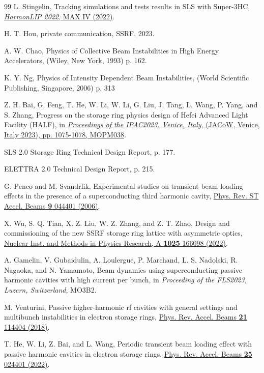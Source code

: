 \documentclass[%
 reprint,
 amsmath,amssymb,
 aps,
]{revtex4-1}
\begin{document}
\begin{thebibliography}{99}
 L. Stingelin, Tracking simulations and tests results in SLS with Super-3HC, \href{https://indico.maxiv.lu.se/event/5098/contributions/6755/attachments/1171/2310/20221001HarmonLIPworkshopV2.pptx}{\emph{HarmonLIP 2022}, MAX IV (2022)}.

 H. T. Hou, private communication, SSRF, 2023.

A. W. Chao, Physics of Collective Beam Instabilities in High Energy Accelerators, (Wiley, New York, 1993) p. 162.

K. Y. Ng,  Physics of Intensity Dependent Beam Instabilities, (World Scientific Publishing, Singapore, 2006) p. 313

Z. H. Bai, G. Feng, T. He, W. Li, W. Li, G. Liu, J. Tang, L. Wang, P. Yang, and S. Zhang, Progress on the storage ring physics design of Hefei Advanced Light Facility (HALF), \href{https://accelconf.web.cern.ch/ipac2023/pdf/MOPM038.pdf}{in \emph{Proceedings of the IPAC2023, Venice, Italy}, (JACoW,  Venice, Italy 2023), pp. 1075-1078, MOPM038}.

SLS 2.0 Storage Ring Technical Design Report, p. 177.

ELETTRA 2.0 Technical Design Report, p. 215.

G. Penco and M. Svandrlik, Experimental studies on transient beam loading effects in the presence of a superconducting third harmonic cavity, \href{https://link.aps.org/doi/10.1103/PhysRevSTAB.9.044401}{Phys. Rev. ST Accel. Beams {\bf 9} 044401 (2006)}.

 X. Wu, S. Q. Tian, X. Z. Liu, W. Z. Zhang, and Z. T. Zhao, Design and commissioning of the new SSRF storage ring lattice with asymmetric optics, \href{https://doi.org/10.1016/j.nima.2021.166098}{Nuclear Inst. and Methods in Physics Research, A {\bf 1025} 166098 (2022)}.

A. Gamelin, V. Gubaidulin, A. Loulergue, P. Marchand, L. S. Nadolski, R. Nagaoka, and N. Yamamoto, Beam dynamics using superconducting passive harmonic cavities with high current per bunch, in \emph{Proceeding of the FLS2023, Luzern, Switzerland}, MO3B2.

M. Venturini, Passive higher-harmonic rf cavities with general settings and multibunch instabilities in electron storage rings, 
\href{https://link.aps.org/doi/10.1103/PhysRevAccelBeams.21.114404}{Phys. Rev. Accel. Beams {\bf 21} 114404 (2018)}.

T. He, W. Li, Z. Bai, and L. Wang, Periodic transient beam loading effect with passive harmonic cavities in electron storage rings, \href{https://link.aps.org/doi/10.1103/PhysRevAccelBeams.25.024401}{Phys. Rev. Accel. Beams {\bf 25} 024401 (2022)}.


\end{thebibliography}
\end{document}
